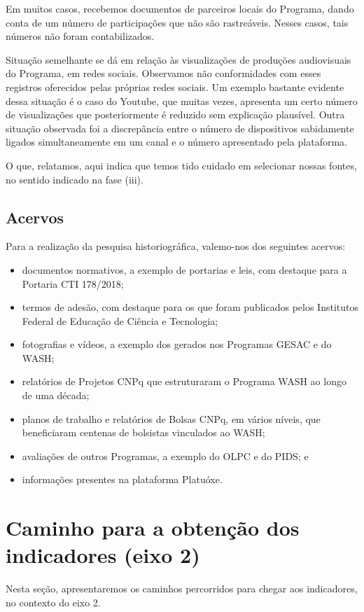Em muitos casos, recebemos documentos de parceiros locais do Programa, dando conta de um número de participações que não são rastreáveis. Nesses casos, tais números não foram contabilizados.

Situação semelhante se dá em relação às visualizações de produções audiovisuais do Programa, em redes sociais. Observamos não conformidades com esses registros oferecidos pelas próprias redes sociais. Um exemplo bastante evidente dessa situação é o caso do Youtube, que muitas vezes, apresenta um certo número de visualizações que posteriormente é reduzido sem explicação plausível. Outra situação observada foi a discrepância entre o número de dispositivos sabidamente ligados simultaneamente em um canal e o número apresentado pela plataforma.

O que, relatamos, aqui indica que temos tido cuidado em selecionar nossas fontes, no sentido indicado na fase (iii).

\subsection[Acervos]{Acervos}\label{Acervos}
Para a realização da pesquisa historiográfica, valemo-nos dos seguintes acervos:


\begin{itemize}
\item documentos normativos, a exemplo de portarias e leis, com destaque para a Portaria CTI 178/2018;
\item termos de adesão, com destaque para os que foram publicados pelos  Institutos Federal de Educação de Ciência e Tecnologia;
\item fotografias e vídeos, a exemplo dos gerados nos Programas GESAC e do WASH;
\item relatórios de Projetos CNPq que estruturaram o Programa WASH ao longo de uma década;
\item planos de trabalho e relatórios de Bolsas CNPq, em vários níveis, que beneficiaram centenas de bolsistas vinculados ao WASH;
\item avaliações de outros Programas, a exemplo do OLPC e do PIDS; e
\item informações presentes na plataforma Platuóxe.
\end{itemize}

\section[Caminho para a obtenção dos indicadores (eixo 2)]{Caminho para a obtenção dos indicadores (eixo 2)}\label{Caminho para a obtenção dos indicadores (eixo 2)}
Nesta seção, apresentaremos os caminhos percorridos para chegar aos indicadores, no contexto do eixo 2.


